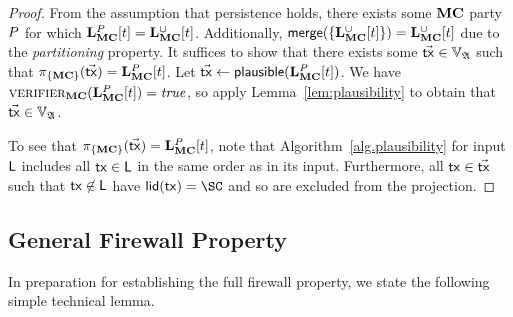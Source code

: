 \begin{proof}
  From the assumption that persistence holds, there exists some $\mathbf{MC}$ party
  $P$
  for which $\mathbf{L}_{\mathbf{MC}}^P[t] = \mathbf{L}_{\mathbf{MC}}^{\cup}[t]$.
  Additionally, $\mathsf{merge}(\{\mathbf{L}_{\mathbf{MC}}^{\cup}[t]\}) = \mathbf{L}_{\mathbf{MC}}^{\cup}[t]$ due to the
  \emph{partitioning} property.
  It suffices to show that there exists some $\vec{\mathsf{tx}} \in \mathbb{V}_{\mathfrak{A}}$ such
  that $\pi_{\{\mathbf{MC}\}}(\vec{\mathsf{tx}}) = \mathbf{L}_{\mathbf{MC}}^{P}[t]$. Let
  $\vec{\mathsf{tx}} \gets \textsf{plausible}(\mathbf{L}_{\mathbf{MC}}^{P}[t])$. We have
  $\textsc{verifier}_{\mathbf{MC}}(\mathbf{L}_{\mathbf{MC}}^{P}[t]) = \text{\emph{true}}$, so apply
  Lemma~\ref{lem:plausibility} to obtain that $\vec{\mathsf{tx}} \in \mathbb{V}_{\mathfrak{A}}$.

  To see that $\pi_{\{\mathbf{MC}\}}(\vec{\mathsf{tx}}) = \mathbf{L}_{\mathbf{MC}}^{P}[t]$, note that
  Algorithm~\ref{alg.plausibility} for input $\mathsf{L}$ includes all $\mathsf{tx} \in \mathsf{L}$ in the
  same order as in its input. Furthermore, all $\mathsf{tx} \in \vec{\mathsf{tx}}$ such that $\mathsf{tx}
  \not\in \mathsf{L}$ have $\llid(\tx) = \SC$ and so are excluded from the projection.
\end{proof}

\subsection{General Firewall Property}

In preparation for establishing the full firewall property, we state the
following simple technical lemma.

